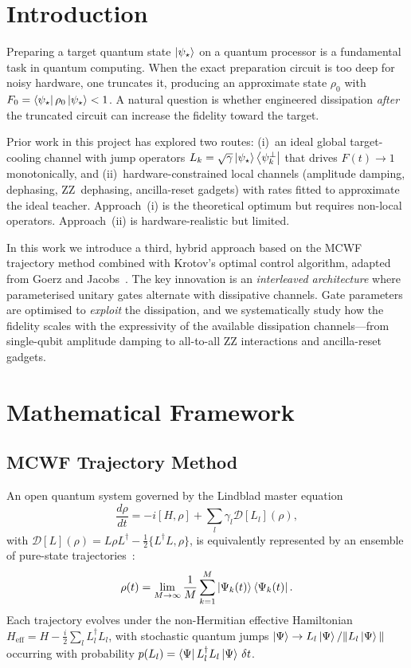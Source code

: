 \documentclass[11pt,a4paper]{article}
\begin{document}
\section{Introduction}

Preparing a target quantum state $\ket{\psi_\star}$ on a quantum
processor is a fundamental task in quantum computing.  When the exact
preparation circuit is too deep for noisy hardware, one truncates it,
producing an approximate state $\rho_0$ with
$F_0 = \bra{\psi_\star}\rho_0\ket{\psi_\star} < 1$.  A natural
question is whether engineered dissipation \emph{after} the truncated
circuit can increase the fidelity toward the target.

Prior work in this project has explored two routes:
(i)~an ideal global target-cooling channel with jump operators
$L_k = \sqrt{\gamma}\ket{\psi_\star}\bra{\psi_k^\perp}$ that drives
$F(t) \to 1$ monotonically, and
(ii)~hardware-constrained local channels (amplitude damping, dephasing,
ZZ~dephasing, ancilla-reset gadgets) with rates fitted to approximate
the ideal teacher.  Approach~(i) is the theoretical optimum but requires
non-local operators.  Approach~(ii) is hardware-realistic but limited.

In this work we introduce a third, hybrid approach based on the
MCWF trajectory method combined with Krotov's optimal control algorithm,
adapted from Goerz and Jacobs~\cite{goerz2018}.  The key innovation is
an \emph{interleaved architecture} where parameterised unitary gates
alternate with dissipative channels.  Gate parameters are optimised to
\emph{exploit} the dissipation, and we systematically study how the
fidelity scales with the expressivity of the available dissipation
channels---from single-qubit amplitude damping to all-to-all ZZ
interactions and ancilla-reset gadgets.


\section{Mathematical Framework}

\subsection{MCWF Trajectory Method}

An open quantum system governed by the Lindblad master equation
\begin{equation}
\frac{d\rho}{dt} = -i[H, \rho] + \sum_l \gamma_l \mathcal{D}[L_l](\rho),
\end{equation}
with $\mathcal{D}[L](\rho) = L\rho L^\dagger -
\tfrac{1}{2}\{L^\dagger L, \rho\}$, is equivalently represented by an
ensemble of pure-state trajectories~\cite{dalibard1992,plenio1998}:
\begin{equation}
\rho(t) = \lim_{M\to\infty} \frac{1}{M}
\sum_{k=1}^{M} \ket{\Psi_k(t)}\bra{\Psi_k(t)}.
\end{equation}
Each trajectory evolves under the non-Hermitian effective Hamiltonian
$H_\mathrm{eff} = H - \tfrac{i}{2} \sum_l L_l^\dagger L_l$, with
stochastic quantum jumps
$\ket{\Psi} \to L_l\ket{\Psi}/\|L_l\ket{\Psi}\|$ occurring with
probability $p(L_l) = \bra{\Psi}L_l^\dagger L_l\ket{\Psi}\,\delta t$.
\end{document}
